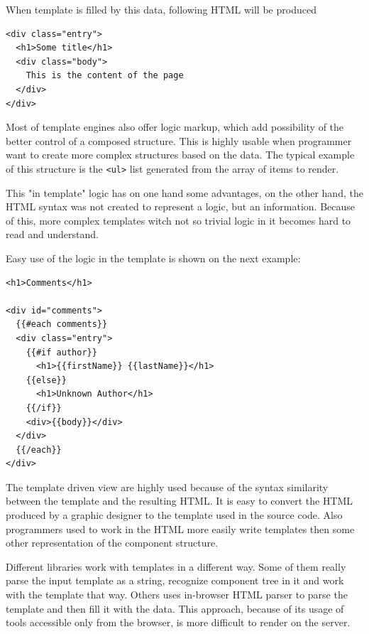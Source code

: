 \documentclass[oneside, 12pt]{book}
\begin{document}


  When template is filled by this data, following HTML will be produced
\begin{verbatim}
<div class="entry">
  <h1>Some title</h1>
  <div class="body">
    This is the content of the page
  </div>
</div>
\end{verbatim}



  Most of template engines also offer logic markup, which add possibility of the better control of a composed structure. 
  This is highly usable when programmer want to create more complex structures based on the data. 
  The typical example of this structure is the \texttt{<ul>} list generated from the array of items to render.
  
  This "in template" logic has on one hand some advantages, on the other hand, 
  the HTML syntax was not created to represent a logic, but an information.
  Because of this, more complex templates witch not so trivial logic in it becomes hard to read and understand.
  
  Easy use of the logic in the template is shown on the next example:
\begin{verbatim}
<h1>Comments</h1>

<div id="comments">
  {{#each comments}}
  <div class="entry">
    {{#if author}}
      <h1>{{firstName}} {{lastName}}</h1>
    {{else}}
      <h1>Unknown Author</h1>
    {{/if}}
    <div>{{body}}</div>
  </div>
  {{/each}}
</div>

\end{verbatim}



  The template driven view are highly used because of the syntax similarity between the template and the resulting HTML. 
  It is easy to convert the HTML produced by a graphic designer to the template used in the source code. 
  Also programmers used to work in the HTML more easily write templates then some other representation of the component structure.

  Different libraries work with templates in a different way. 
  Some of them really parse the input template as a string, recognize component tree in it and work with the template that way.
  Others uses in-browser HTML parser to parse the template and then fill it with the data.
  This approach, because of its usage of tools accessible only from the browser, is more difficult to render on the server.
\end{document}
